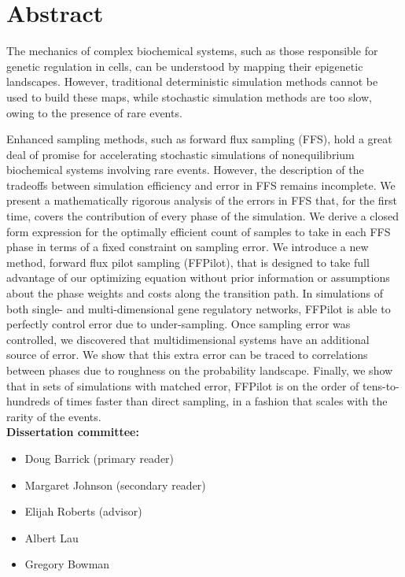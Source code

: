 \chapter*{Abstract}

The mechanics of complex biochemical systems, such as those responsible for genetic regulation in cells, can be understood by mapping their epigenetic landscapes. However, traditional deterministic simulation methods cannot be used to build these maps, while stochastic simulation methods are too slow, owing to the presence of rare events.

Enhanced sampling methods, such as forward flux sampling (FFS), hold a great deal of promise for accelerating stochastic simulations of nonequilibrium biochemical systems involving rare events. However, the description of the tradeoffs between simulation efficiency and error in FFS remains incomplete. We present a mathematically rigorous analysis of the errors in FFS that, for the first time, covers the contribution of every phase of the simulation. We derive a closed form expression for the optimally efficient count of samples to take in each FFS phase in terms of a fixed constraint on sampling error. We introduce a new method, forward flux pilot sampling (FFPilot), that is designed to take full advantage of our optimizing equation without prior information or assumptions about the phase weights and costs along the transition path. In simulations of both single- and multi-dimensional gene regulatory networks, FFPilot is able to perfectly control error due to under-sampling. Once sampling error was controlled, we discovered that multidimensional systems have an additional source of error. We show that this extra error can be traced to correlations between phases due to roughness on the probability landscape. Finally, we show that in sets of  simulations with matched error, FFPilot is on the order of tens-to-hundreds of times faster than direct sampling, in a fashion that scales with the rarity of the events.
\\[6in]
\textbf{Dissertation committee:}
\begin{itemize}
    \item{Doug Barrick (primary reader)}
    \item{Margaret Johnson (secondary reader)}
    \item{Elijah Roberts (advisor)}
    \item{Albert Lau}
    \item{Gregory Bowman}
\end{itemize}
